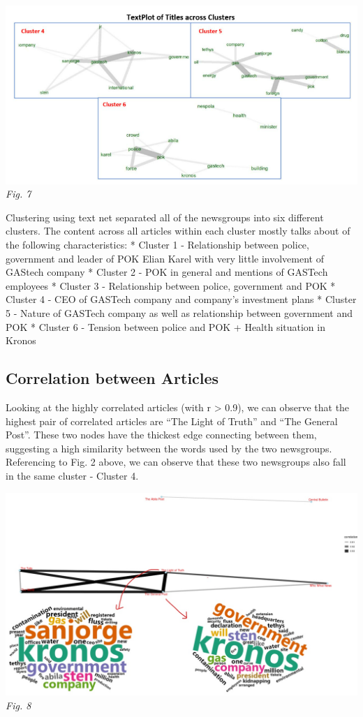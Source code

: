 \documentclass{acm_proc_article-sp}
\begin{document}
\includegraphics{img/image13.png} \emph{Fig. 7}

Clustering using text net separated all of the newsgroups into six
different clusters. The content across all articles within each cluster
mostly talks about of the following characteristics: * Cluster 1 -
Relationship between police, government and leader of POK Elian Karel
with very little involvement of GAStech company * Cluster 2 - POK in
general and mentions of GASTech employees * Cluster 3 - Relationship
between police, government and POK * Cluster 4 - CEO of GASTech company
and company's investment plans * Cluster 5 - Nature of GASTech company
as well as relationship between government and POK * Cluster 6 - Tension
between police and POK + Health situation in Kronos

\hypertarget{correlation-between-articles}{%
\subsection{Correlation between
Articles}\label{correlation-between-articles}}

Looking at the highly correlated articles (with r \textgreater{} 0.9),
we can observe that the highest pair of correlated articles are ``The
Light of Truth'' and ``The General Post''. These two nodes have the
thickest edge connecting between them, suggesting a high similarity
between the words used by the two newsgroups. Referencing to Fig. 2
above, we can observe that these two newsgroups also fall in the same
cluster - Cluster 4.

\includegraphics{img/image16.jpg} \emph{Fig. 8}
\end{document}
